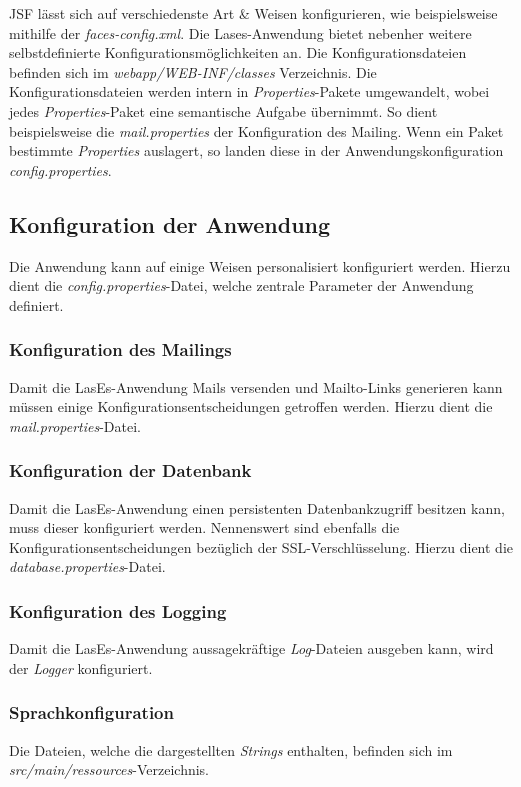 JSF lässt sich auf verschiedenste Art \& Weisen konfigurieren, wie beispielsweise
mithilfe der \emph{faces-config.xml}.
Die Lases-Anwendung bietet nebenher weitere selbstdefinierte Konfigurationsmöglichkeiten an.
Die Konfigurationsdateien befinden sich im \emph{webapp/WEB-INF/classes} Verzeichnis.
Die Konfigurationsdateien werden intern in \emph{Properties}-Pakete umgewandelt,
wobei jedes \emph{Properties}-Paket eine semantische Aufgabe übernimmt.
So dient beispielsweise die \emph{mail.properties} der Konfiguration des Mailing.
Wenn ein Paket bestimmte \emph{Properties} auslagert,
so landen diese in der Anwendungskonfiguration \emph{config.properties}.

\subsection{Konfiguration der Anwendung}
Die Anwendung kann auf einige Weisen personalisiert konfiguriert werden.
Hierzu dient die \emph{config.properties}-Datei,  %
welche zentrale Parameter der Anwendung definiert.

\subsubsection{Konfiguration des Mailings}
Damit die LasEs-Anwendung Mails versenden und Mailto-Links generieren kann
müssen einige Konfigurationsentscheidungen getroffen werden.
Hierzu dient die \emph{mail.properties}-Datei.

\subsubsection{Konfiguration der Datenbank}
Damit die LasEs-Anwendung einen persistenten Datenbankzugriff besitzen kann,
muss dieser konfiguriert werden. Nennenswert sind ebenfalls die
Konfigurationsentscheidungen bezüglich der SSL-Verschlüsselung.
Hierzu dient die \emph{database.properties}-Datei.

\subsubsection{Konfiguration des Logging}
Damit die LasEs-Anwendung aussagekräftige \emph{Log}-Dateien ausgeben kann,
wird der \emph{Logger} konfiguriert.

\subsubsection{Sprachkonfiguration}
Die Dateien, welche die dargestellten \emph{Strings} enthalten, befinden sich im
\emph{src/main/ressources}-Verzeichnis.

